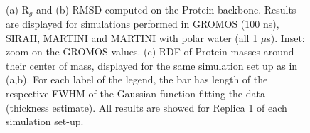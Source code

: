 \begin{figure}[p!]
\centering
{} 
 \\
\caption[Structural measures on buckyball in solution]{(a) R$_g$ and (b) RMSD computed on the Protein backbone. Results are displayed for simulations performed in GROMOS (100 ns), SIRAH, MARTINI and MARTINI with polar water (all 1 $\mu$s). Inset: zoom on the GROMOS values. (c) RDF of Protein masses around their center of mass, displayed for the same simulation set up as in (a,b). For each label of the legend, the bar has length of the respective FWHM of the Gaussian function fitting the data (thickness estimate). All results are showed for Replica 1 of each simulation set-up.}
\label{fig:struct_UA_SIhere}
\end{figure}
%
